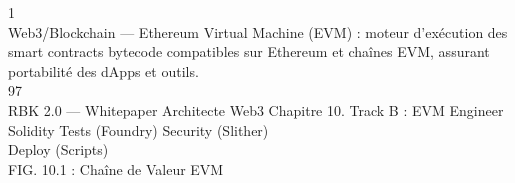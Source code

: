 \vspace{0.5em}
1\\
Web3/Blockchain — Ethereum Virtual Machine (EVM) : moteur d’exécution des smart contracts bytecode compatibles sur Ethereum et chaînes EVM, assurant\\
portabilité des dApps et outils.\\
\vspace{0.5em}
\vspace{0.5em}
\vspace{0.5em}
\vspace{0.5em}
97\\
RBK 2.0 — Whitepaper Architecte Web3                                                                Chapitre 10. Track B : EVM Engineer\\
\vspace{0.5em}
\vspace{0.5em}
Solidity         Tests (Foundry)        Security (Slither)\\
\vspace{0.5em}
\vspace{0.5em}
\vspace{0.5em}
Deploy (Scripts)\\
\vspace{0.5em}
FIG. 10.1 : Chaîne de Valeur EVM\\
\vspace{0.5em}
\vspace{0.5em}
\vspace{0.5em}
